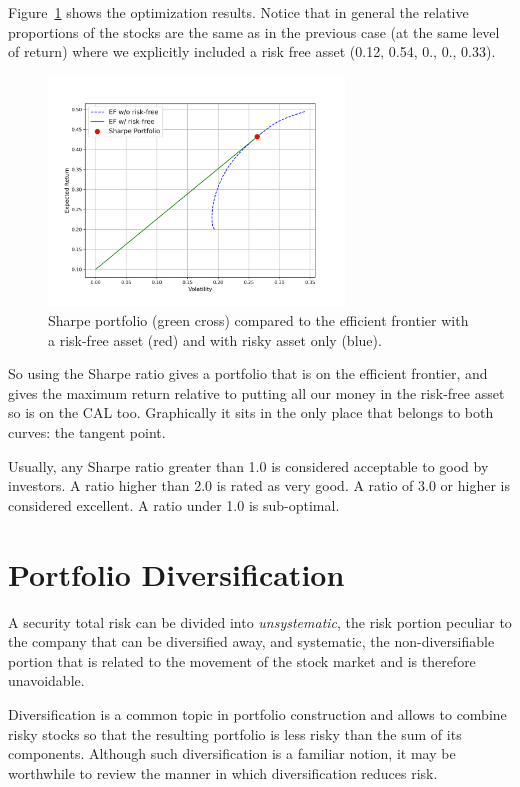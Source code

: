 Figure~\ref{fig:sharpe_ratio} shows the optimization results. Notice that in general the relative proportions of the stocks are the same as in the previous case (at the same level of return) where we explicitly included a risk free asset (0.12, 0.54, 0., 0., 0.33).

\begin{figure}[htb]
\centering
\includegraphics[width=0.7\textwidth]{figures/sharpe_ratio}
\caption{Sharpe portfolio (green cross) compared to the efficient frontier with a risk-free asset (red) and with risky asset only (blue).}
\label{fig:sharpe_ratio}
\end{figure}

So using the Sharpe ratio gives a portfolio that is on the efficient frontier, and gives the maximum return relative to putting all our money in the risk-free asset so is on the CAL too. Graphically it sits in the only place that belongs to both curves: the tangent point.

Usually, any Sharpe ratio greater than 1.0 is considered acceptable to good by investors. A ratio higher than 2.0 is rated as very good. A ratio of 3.0 or higher is considered excellent. A ratio under 1.0 is sub-optimal.

\section{Portfolio Diversification}

A security total risk can be divided into \emph{unsystematic}, the risk portion peculiar to the company that can be diversified away, and systematic, the non-diversifiable portion that is related to the movement of the stock market and is therefore unavoidable. 

Diversification is a common topic in portfolio construction and allows to combine risky stocks so that the resulting portfolio is less risky than the sum of its components. Although such diversification is a familiar notion, it may be worthwhile to review the manner in which diversification reduces risk.

